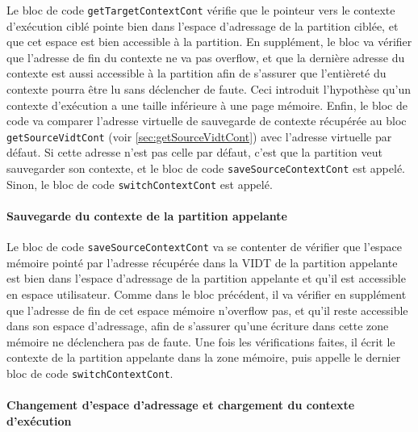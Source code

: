 		Le bloc de code \texttt{getTargetContextCont} vérifie que le pointeur vers le contexte d'exécution ciblé pointe bien dans l'espace d'adressage de la partition ciblée, et que cet espace est bien accessible à la partition. En supplément, le bloc va vérifier que l'adresse de fin du contexte ne va pas overflow, et que la dernière adresse du contexte est aussi accessible à la partition afin de s'assurer que l'entièreté du contexte pourra être lu sans déclencher de faute. Ceci introduit l'hypothèse qu'un contexte d'exécution a une taille inférieure à une page mémoire.
		Enfin, le bloc de code va comparer l'adresse virtuelle de sauvegarde de contexte récupérée au bloc \texttt{getSourceVidtCont} (voir \ref{sec:getSourceVidtCont}) avec l'adresse virtuelle par défaut. Si cette adresse n'est pas celle par défaut, c'est que la partition veut sauvegarder son contexte, et le bloc de code \texttt{saveSourceContextCont} est appelé. Sinon, le bloc de code \texttt{switchContextCont} est appelé.

		\paragraph{Sauvegarde du contexte de la partition appelante}

		Le bloc de code \texttt{saveSourceContextCont} va se contenter de vérifier que l'espace mémoire pointé par l'adresse récupérée dans la VIDT de la partition appelante est bien dans l'espace d'adressage de la partition appelante et qu'il est accessible en espace utilisateur. Comme dans le bloc précédent, il va vérifier en supplément que l'adresse de fin de cet espace mémoire n'overflow pas, et qu'il reste accessible dans son espace d'adressage, afin de s'assurer qu'une écriture dans cette zone mémoire ne déclenchera pas de faute. Une fois les vérifications faites, il écrit le contexte de la partition appelante dans la zone mémoire, puis appelle le dernier bloc de code \texttt{switchContextCont}.

		\paragraph{Changement d'espace d'adressage et chargement du contexte d'exécution}

